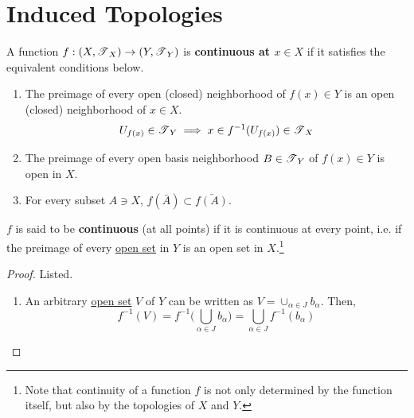 \section{Induced Topologies} 

  \begin{definition}
		\label{def:continuous_func}
    A function $f: (X, \operatorname{\mathscr{T}}_{X}) \to (Y, \operatorname{\mathscr{T}}_{Y})$ is \textbf{continuous at $x \in X$} if it satisfies the equivalent conditions below. 
		\begin{enumerate}
		  \item The preimage of every open (closed) neighborhood of $f(x) \in Y$ is an open (closed) neighborhood of $x \in X$.
				\begin{equation}
					U_{f(x)} \in \operatorname{\mathscr{T}}_{Y} \implies x \in f^{-1}(U_{f(x)}) \in \operatorname{\mathscr{T}}_{X}
				\end{equation} 

			\item The preimage of every open basis neighborhood $B \in \operatorname{\mathscr{T}}_Y$ of $f(x) \in Y$ is open in $X$. 

			\item For every subset $A \ni X$, $f(\bar{A}) \subset \bar{f(A)}$. 
		\end{enumerate}

    $f$ is said to be \textbf{continuous} (at all points) if it is continuous at every point, i.e. if the preimage of every \hyperref[def:open-set]{open set} in $Y$ is an open set in $X$.\footnote{Note that continuity of a function $f$ is not only determined by the function itself, but also by the topologies of $X$ and $Y$.}
  \end{definition}
  \begin{proof}
    Listed. 
    \begin{enumerate}
      \item An arbitrary \hyperref[def:open-set]{open set} $V$ of $Y$ can be written as $V = \cup_{\alpha \in J} b_\alpha$. Then, 
      \begin{equation}
        f^{-1} (V) = f^{-1} \Big( \bigcup_{\alpha \in J} b_\alpha \Big) = \bigcup_{\alpha \in J} f^{-1} (b_\alpha)
      \end{equation}
    \end{enumerate}
  \end{proof}

